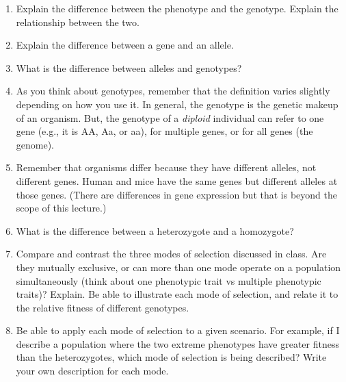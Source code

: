 \documentclass[letterpaper]{tufte-handout}
\begin{document}
\begin{enumerate}

	\item Explain the difference between the phenotype and the genotype. Explain the relationship between the two.

	\item Explain the difference between a gene and an allele. 

	\item What is the difference between alleles and genotypes?  

	\item As you think about genotypes, remember that the definition varies slightly depending on how you use it. In general, the genotype is the genetic makeup of an organism. But, the genotype of a \emph{diploid} individual can refer to one gene (e.g., it is AA, Aa, or aa), for multiple genes, or for all genes (the genome).

	\item Remember that organisms differ because they have different alleles, not different genes. Human and mice have the same genes but different alleles at those genes.  (There are differences in gene expression but that is beyond the scope of this lecture.)
 
	\item What is the difference between a heterozygote and a homozygote?

	\item Compare and contrast the three modes of selection discussed in class.  Are they mutually exclusive, or can more than one mode operate on a population simultaneously (think about one phenotypic trait vs multiple phenotypic traits)?  Explain.  Be able to illustrate each mode of selection, and relate it to the relative fitness of different genotypes.  

	\item Be able to apply each mode of selection to a given scenario.  For example, if I describe a population where the two extreme phenotypes have greater fitness than the heterozygotes, which mode of selection is being described?  Write your own description for each mode.

\end{enumerate}
\end{document}

